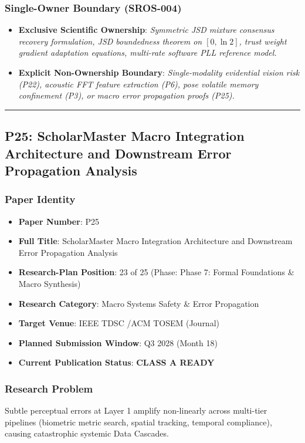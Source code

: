 \documentclass[11pt,letterpaper]{article}
\begin{document}
\subsubsection{Single-Owner Boundary (SROS-004)}
\begin{itemize}[leftmargin=*]
    \item \textbf{Exclusive Scientific Ownership}: \textit{Symmetric JSD mixture consensus recovery formulation, JSD boundedness theorem on $[0, \ln 2]$, trust weight gradient adaptation equations, multi-\allowbreak rate software PLL reference model.}
    \item \textbf{Explicit Non-Ownership Boundary}: \textit{Single-\allowbreak modality evidential vision risk (P22), acoustic FFT feature extraction (P6), pose volatile memory confinement (P3), or macro error propagation proofs (P25).}
\end{itemize}

\vspace{0.4cm}
\hrule

\subsection{P25: ScholarMaster Macro Integration Architecture and Downstream Error Propagation Analysis}
\label{sec:profile_p25}

\subsubsection{Paper Identity}
\begin{itemize}[leftmargin=*]
    \item \textbf{Paper Number}: P25
    \item \textbf{Full Title}: ScholarMaster Macro Integration Architecture and Downstream Error Propagation Analysis
    \item \textbf{Research-Plan Position}: 23 of 25 (Phase: Phase 7: Formal Foundations \& Macro Synthesis)
    \item \textbf{Research Category}: Macro Systems Safety \& Error Propagation
    \item \textbf{Target Venue}: IEEE TDSC /\allowbreak  ACM TOSEM (Journal)
    \item \textbf{Planned Submission Window}: Q3 2028 (Month 18)
    \item \textbf{Current Publication Status}: \textbf{CLASS A READY}
\end{itemize}

\subsubsection{Research Problem}
Subtle perceptual errors at Layer 1 amplify non-\allowbreak linearly across multi-\allowbreak tier pipelines (biometric metric search, spatial tracking, temporal compliance), causing catastrophic systemic Data Cascades.
\end{document}
